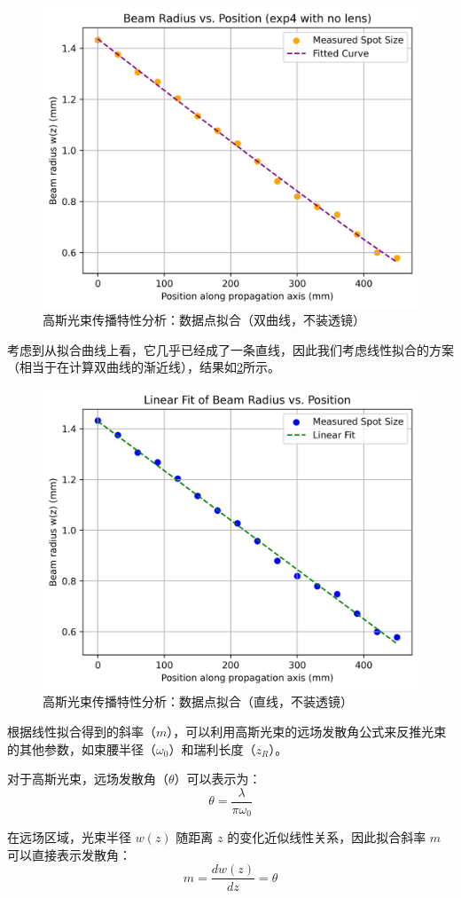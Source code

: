 \begin{enumerate}
\begin{enumerate}
		\begin{figure}[h!]
			\centering
			\includegraphics[width=0.6\linewidth]{images/APL1_8_exp4_analysis_nolens_1}
			\caption{高斯光束传播特性分析：数据点拟合（双曲线，不装透镜）}
			\label{fig:apl18exp4analysisnolens1}
		\end{figure}
		
		考虑到从拟合曲线上看，它几乎已经成了一条直线，因此我们考虑线性拟合的方案（相当于在计算双曲线的渐近线），结果如\cref{fig:apl18exp4analysisnolens2}所示。
		
		\begin{figure}[h!]
			\centering
			\includegraphics[width=0.6\linewidth]{images/APL1_8_exp4_analysis_nolens_2}
			\caption{高斯光束传播特性分析：数据点拟合（直线，不装透镜）}
			\label{fig:apl18exp4analysisnolens2}
		\end{figure}
		
		根据线性拟合得到的斜率（\(m\)），可以利用高斯光束的远场发散角公式来反推光束的其他参数，如束腰半径（\(\omega_0\)）和瑞利长度（\(z_R\)）。
		
		对于高斯光束，远场发散角（\(\theta\)）可以表示为：
		\[
		\theta = \frac{\lambda}{\pi \omega_0}
		\]
		
		在远场区域，光束半径 \(w(z)\) 随距离 \(z\) 的变化近似线性关系，因此拟合斜率 \(m\) 可以直接表示发散角：
		\[
		m = \frac{d w(z)}{d z} = \theta
		\]
		

\end{enumerate}
\end{enumerate}
